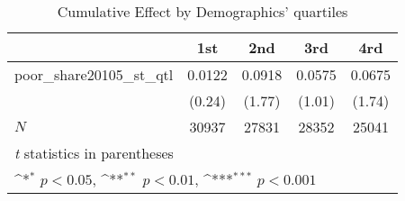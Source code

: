 \begin{table}[htbp]\centering
\def\sym#1{\ifmmode^{#1}\else\(^{#1}\)\fi}
\caption{Cumulative Effect by Demographics' quartiles}
\begin{tabular}{l*{4}{c}}
\hline\hline
            &\multicolumn{1}{c}{1st}&\multicolumn{1}{c}{2nd}&\multicolumn{1}{c}{3rd}&\multicolumn{1}{c}{4rd}\\
\hline
poor\_share20105\_st\_qtl&      0.0122         &      0.0918         &      0.0575         &      0.0675         \\
            &      (0.24)         &      (1.77)         &      (1.01)         &      (1.74)         \\
\hline
\(N\)       &       30937         &       27831         &       28352         &       25041         \\
\hline\hline
\multicolumn{5}{l}{\footnotesize \textit{t} statistics in parentheses}\\
\multicolumn{5}{l}{\footnotesize \sym{*} \(p<0.05\), \sym{**} \(p<0.01\), \sym{***} \(p<0.001\)}\\
\end{tabular}
\end{table}
